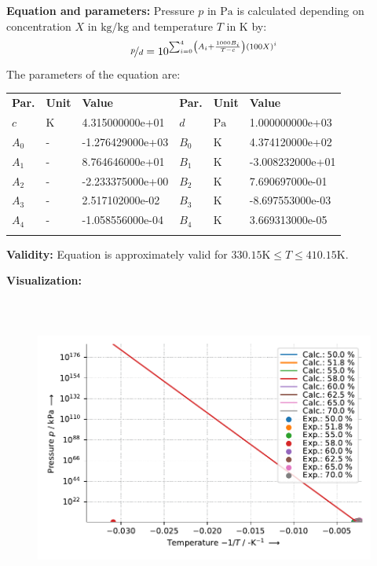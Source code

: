 \textbf{Equation and parameters:}
\newline
%
Pressure $p$ in $\si{\pascal}$ is calculated depending on concentration $X$ in $\si{\kilogram\per\kilogram}$ and  temperature $T$ in $\si{\kelvin}$ by:
%
\begin{equation*}
\nicefrac{p}{d} = 10 ^ { \sum_{i=0}^{4} \left( A_i + \frac{1000 B_i}{T - c} \right) \left( 100 X \right) ^{i}}
\end{equation*}
%
The parameters of the equation are:
%
\begin{longtable}[l]{lll|lll}
\toprule
\addlinespace
\textbf{Par.} & \textbf{Unit} & \textbf{Value} &	\textbf{Par.} & \textbf{Unit} & \textbf{Value} \\
\addlinespace
\midrule
\endhead

\bottomrule
\endfoot
\bottomrule
\endlastfoot
\addlinespace

$c$ & $\si{\kelvin}$ & 4.315000000e+01 & $d$ & $\si{\pascal}$ & 1.000000000e+03 \\
$A_0$ & - & -1.276429000e+03 & $B_0$ & $\si{\kelvin}$ & 4.374120000e+02 \\
$A_1$ & - & 8.764646000e+01 & $B_1$ & $\si{\kelvin}$ & -3.008232000e+01 \\
$A_2$ & - & -2.233375000e+00 & $B_2$ & $\si{\kelvin}$ & 7.690697000e-01 \\
$A_3$ & - & 2.517102000e-02 & $B_3$ & $\si{\kelvin}$ & -8.697553000e-03 \\
$A_4$ & - & -1.058556000e-04 & $B_4$ & $\si{\kelvin}$ & 3.669313000e-05 \\

\addlinespace\end{longtable}

\textbf{Validity:}
\newline
Equation is approximately valid for $330.15 \si{\kelvin} \leq T \leq 410.15 \si{\kelvin}$.
\newline

\textbf{Visualization:}
%
\begin{figure}[!htp]
{\noindent\includegraphics[height=10cm, keepaspectratio]{figs/abs/abs_Water_LiBr_LiNO3_LiI_LiCl_ratio_5_1_1_2_Antoine_1.pdf}}
\end{figure}
%

